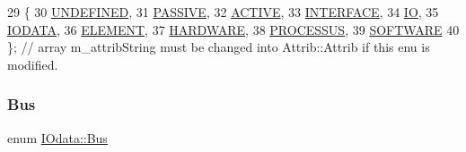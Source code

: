 \begin{DoxyCode}
29                 \{
30     \hyperlink{classAttrib_a69e171d7cc6417835a5a306d3c764235a3a8da2ab97dda18aebab196fe4100531}{UNDEFINED},
31     \hyperlink{classAttrib_a69e171d7cc6417835a5a306d3c764235a2bfb2af57b87031d190a05fe25dd92ed}{PASSIVE},
32     \hyperlink{classAttrib_a69e171d7cc6417835a5a306d3c764235a3b1fec929c0370d1436f2f06e298fb0d}{ACTIVE},
33     \hyperlink{classAttrib_a69e171d7cc6417835a5a306d3c764235aa27c16b480a369ea4d18b07b2516bbc7}{INTERFACE},
34     \hyperlink{classAttrib_a69e171d7cc6417835a5a306d3c764235a1420a5b8c0540b2af210b6975eded7f9}{IO},
35     \hyperlink{classAttrib_a69e171d7cc6417835a5a306d3c764235a0af3b0d0ac323c1704e6c69cf90add28}{IODATA},
36     \hyperlink{classAttrib_a69e171d7cc6417835a5a306d3c764235a7788bc5dd333fd8ce18562b269c9dab1}{ELEMENT},
37     \hyperlink{classAttrib_a69e171d7cc6417835a5a306d3c764235a61ceb22149f365f1780d18f9d1459423}{HARDWARE},
38     \hyperlink{classAttrib_a69e171d7cc6417835a5a306d3c764235a75250e29692496e73effca2c0330977f}{PROCESSUS},
39     \hyperlink{classAttrib_a69e171d7cc6417835a5a306d3c764235a103a67cd0b8f07ef478fa45d4356e27b}{SOFTWARE} 
40   \}; \textcolor{comment}{// array m\_attribString must be changed into Attrib::Attrib if this enu is modified. }
\end{DoxyCode}
\mbox{\label{classIOdata_a99aa7bed39364c4359ab8a7596bc013c}} 
\subsubsection{\texorpdfstring{Bus}{Bus}}
{\footnotesize\ttfamily enum \hyperlink{classIOdata_a99aa7bed39364c4359ab8a7596bc013c}{I\+Odata\+::\+Bus}}


